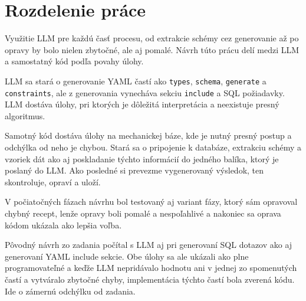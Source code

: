 \section{Rozdelenie práce}

\label{sub:rozdelenie_prace}

Využitie LLM pre každú časť procesu, od extrakcie schémy cez generovanie až po opravy by bolo nielen zbytočné, ale aj pomalé. Návrh túto prácu delí medzi LLM a samostatný kód podľa povahy úlohy. 


LLM sa stará o generovanie YAML častí ako \texttt{types}, \texttt{schema}, \texttt{generate} a \texttt{constraints}, ale z generovania vynecháva sekciu \texttt{include} a SQL požiadavky. LLM dostáva úlohy, pri ktorých je dôležitá interpretácia a neexistuje presný algoritmus.


Samotný kód dostáva úlohy na mechanickej báze, kde je nutný presný postup a odchýlka od neho je chybou. Stará sa o pripojenie k databáze, extrakciu schémy a vzoriek dát ako aj poskladanie týchto informácií do jedného balíka, ktorý je poslaný do LLM. Ako posledné si prevezme vygenerovaný výsledok, ten skontroluje, opraví a uloží. 


V počiatočných fázach návrhu bol testovaný aj variant fázy, ktorý sám opravoval chybný recept, lenže opravy boli pomalé a nespoľahlivé a nakoniec sa oprava kódom ukázala ako lepšia voľba. 


Pôvodný návrh zo zadania počítal s LLM aj pri generovaní SQL dotazov ako aj generovaní YAML include sekcie. Obe úlohy sa ale ukázali ako plne programovateľné a keďže LLM nepridávalo hodnotu ani v jednej zo spomenutých častí a vytváralo zbytočné chyby, implementácia týchto častí bola zverená kódu. Ide o zámernú odchýlku od zadania.

